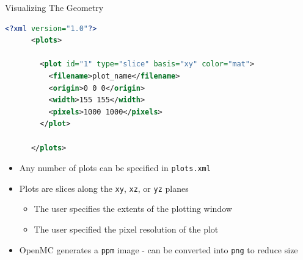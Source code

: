 \begin{frame}[fragile]{Visualizing The Geometry}

  \begin{scriptsize}
    \begin{lstlisting}[language=XML,gobble=4]
      <?xml version="1.0"?>
      <plots>

        <plot id="1" type="slice" basis="xy" color="mat">
          <filename>plot_name</filename>
          <origin>0 0 0</origin>
          <width>155 155</width>
          <pixels>1000 1000</pixels>
        </plot>
        
      </plots>
    \end{lstlisting}
  \end{scriptsize}

  \begin{itemize}
    \item Any number of plots can be specified in \verb|plots.xml| 
    \item Plots are slices along the \verb|xy|, \verb|xz|, or \verb|yz| planes
    \begin{itemize}
      \item The user specifies the extents of the plotting window
      \item The user specified the pixel resolution of the plot
    \end{itemize}
    \item OpenMC generates a \verb|ppm| image - can be converted into \verb|png| to reduce size
  \end{itemize}
  
\end{frame}


